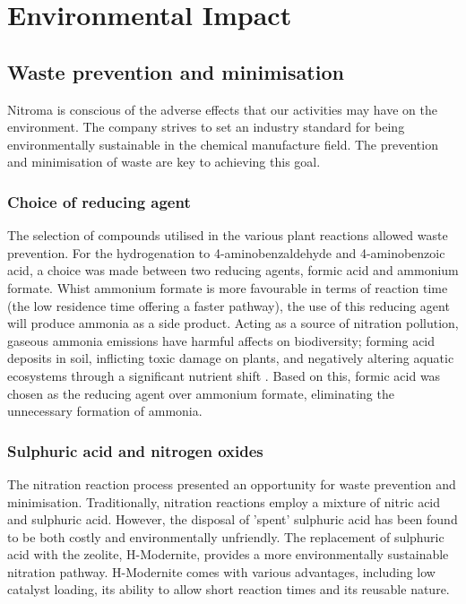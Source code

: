 \section{Environmental Impact}

\subsection{Waste prevention and minimisation}

Nitroma is conscious of the adverse effects that our activities may have on the environment. The company strives to set an industry standard for being environmentally sustainable in the chemical manufacture field. The prevention and minimisation of waste are key to achieving this goal. 

\subsubsection{Choice of reducing agent}
The selection of compounds utilised in the various plant reactions allowed waste prevention. For the hydrogenation to 4-aminobenzaldehyde and 4-aminobenzoic acid, a choice was made between two reducing agents, formic acid and ammonium formate. Whist ammonium formate is more favourable in terms of reaction time (the low residence time offering a faster pathway), the use of this reducing agent will produce ammonia as a side product. Acting as a  source of nitration pollution, gaseous ammonia emissions have harmful affects on biodiversity; forming acid deposits in soil, inflicting toxic damage on plants, and negatively altering aquatic ecosystems through a significant nutrient shift \cite{european_environment_agency_ammonia_2019}. Based on this, formic acid was chosen as the reducing agent over ammonium formate, eliminating the unnecessary formation of ammonia. 

\subsubsection{Sulphuric acid and nitrogen oxides}
The nitration reaction process presented an opportunity for waste prevention and minimisation. Traditionally, nitration reactions employ a mixture of nitric acid and sulphuric acid. However, the disposal of 'spent' sulphuric acid has been found to be both costly and environmentally unfriendly. The replacement of sulphuric acid with the zeolite, H-Modernite, provides a more environmentally sustainable nitration pathway. H-Modernite comes with various advantages, including low catalyst loading, its ability to allow short reaction times and its reusable nature. 

